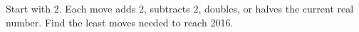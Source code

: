 Start with 2. Each move adds 2, subtracts 2, doubles, or halves the current real number. Find the least moves needed to reach 2016.
